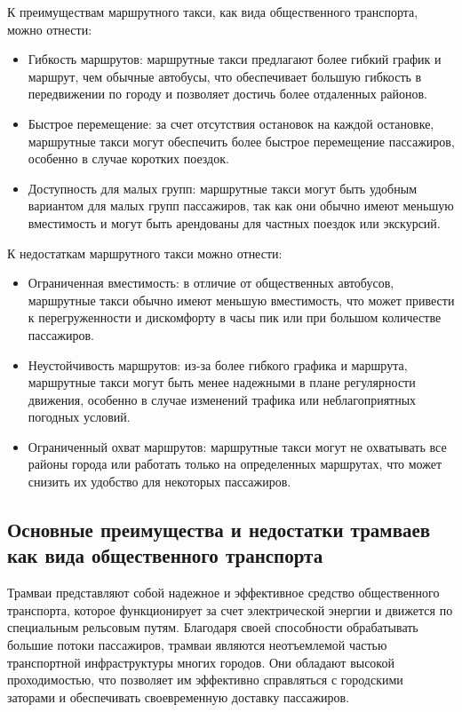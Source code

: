 К преимуществам маршрутного такси, как вида общественного транспорта, можно отнести:
\begin{itemize}
	\item Гибкость маршрутов: маршрутные такси предлагают более гибкий график и маршрут, чем обычные автобусы, что обеспечивает большую гибкость в передвижении по городу и позволяет достичь более отдаленных районов.
	\item Быстрое перемещение: за счет отсутствия остановок на каждой остановке, маршрутные такси могут обеспечить более быстрое перемещение пассажиров, особенно в случае коротких поездок.
	\item Доступность для малых групп: маршрутные такси могут быть удобным вариантом для малых групп пассажиров, так как они обычно имеют меньшую вместимость и могут быть арендованы для частных поездок или экскурсий.
\end{itemize}

К недостаткам маршрутного такси можно отнести:
\begin{itemize}
	\item Ограниченная вместимость: в отличие от общественных автобусов, маршрутные такси обычно имеют меньшую вместимость, что может привести к перегруженности и дискомфорту в часы пик или при большом количестве пассажиров.
	\item Неустойчивость маршрутов: из-за более гибкого графика и маршрута, маршрутные такси могут быть менее надежными в плане регулярности движения, особенно в случае изменений трафика или неблагоприятных погодных условий.
	\item Ограниченный охват маршрутов: маршрутные такси могут не охватывать все районы города или работать только на определенных маршрутах, что может снизить их удобство для некоторых пассажиров.
\end{itemize}

\subsection{Основные преимущества и недостатки трамваев как вида общественного транспорта}

Трамваи представляют собой надежное и эффективное средство общественного транспорта, которое функционирует за счет электрической энергии и движется по специальным рельсовым путям. Благодаря своей способности обрабатывать большие потоки пассажиров, трамваи являются неотъемлемой частью транспортной инфраструктуры многих городов. Они обладают высокой проходимостью, что позволяет им эффективно справляться с городскими заторами и обеспечивать своевременную доставку пассажиров.

